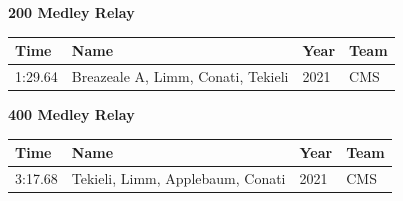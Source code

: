\vspace{1.2em}
\noindent\begin{minipage}[t]{0.98\textwidth}
\centering
\textbf{\textcolor{teamprimary}{200 Medley Relay}}\par
\vspace{0.5em}
\centering
\small
\renewcommand{\arraystretch}{1.0}
\setlength{\tabcolsep}{4pt}
\begin{tabular}{@{}p{2.7cm}p{4.3cm}p{1.6cm}p{2.7cm}@{}}
\toprule
\textbf{Time} & \textbf{Name} & \textbf{Year} & \textbf{Team} \\
\midrule
1:29.64 & Breazeale A, Limm, Conati, Tekieli & 2021 & CMS \\
\bottomrule
\end{tabular}
\end{minipage}
\vspace{1.2em}
\noindent\begin{minipage}[t]{0.98\textwidth}
\centering
\textbf{\textcolor{teamprimary}{400 Medley Relay}}\par
\vspace{0.5em}
\centering
\small
\renewcommand{\arraystretch}{1.0}
\setlength{\tabcolsep}{4pt}
\begin{tabular}{@{}p{2.7cm}p{4.3cm}p{1.6cm}p{2.7cm}@{}}
\toprule
\textbf{Time} & \textbf{Name} & \textbf{Year} & \textbf{Team} \\
\midrule
3:17.68 & Tekieli, Limm, Applebaum, Conati & 2021 & CMS \\
\bottomrule
\end{tabular}
\end{minipage}
\clearpage
